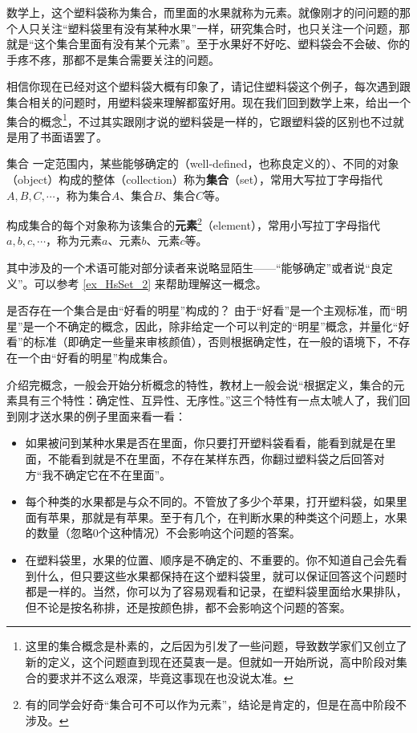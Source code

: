 数学上，这个塑料袋称为集合，而里面的水果就称为元素。就像刚才的问问题的那个人只关注“塑料袋里有没有某种水果”一样，研究集合时，也只关注一个问题，那就是“这个集合里面有没有某个元素”。至于水果好不好吃、塑料袋会不会破、你的手疼不疼，那都不是集合需要关注的问题。

相信你现在已经对这个塑料袋大概有印象了，请记住塑料袋这个例子，每次遇到跟集合相关的问题时，用塑料袋来理解都蛮好用。现在我们回到数学上来，给出一个集合的概念\footnote{这里的集合概念是朴素的，之后因为引发了一些问题，导致数学家们又创立了新的定义，这个问题直到现在还莫衷一是。但就如一开始所说，高中阶段对集合的要求并不这么艰深，毕竟这事现在也没说太准。}，不过其实跟刚才说的塑料袋是一样的，它跟塑料袋的区别也不过就是用了书面语罢了。

\begin{definition}{集合}\label{def_HsSet_2}
一定范围内，某些能够确定的（well-defined，也称良定义的）、不同的对象（object）构成的整体（collection）称为\textbf{集合}（set），常用大写拉丁字母指代$A,B,C,\cdots$，称为集合$A$、集合$B$、集合$C$等。

构成集合的每个对象称为该集合的\textbf{元素}\footnote{有的同学会好奇“集合可不可以作为元素”，结论是肯定的，但是在高中阶段不涉及。}（element），常用小写拉丁字母指代$a,b,c,\cdots$，称为元素$a$、元素$b$、元素$c$等。
\end{definition}

其中涉及的一个术语可能对部分读者来说略显陌生——“能够确定”或者说“良定义”。可以参考 \autoref{ex_HsSet_2} 来帮助理解这一概念。

\begin{example}{是否存在一个集合是由“好看的明星”构成的？}\label{ex_HsSet_2}
由于“好看”是一个主观标准，而“明星”是一个不确定的概念，因此，除非给定一个可以判定的“明星”概念，并量化“好看”的标准（即确定一些量来审核颜值），否则根据确定性，在一般的语境下，不存在一个由“好看的明星”构成集合。
\end{example}

介绍完概念，一般会开始分析概念的特性，教材上一般会说“根据定义，集合的元素具有三个特性：确定性、互异性、无序性。”这三个特性有一点太唬人了，我们回到刚才送水果的例子里面来看一看：

\begin{itemize}
\item 如果被问到某种水果是否在里面，你只要打开塑料袋看看，能看到就是在里面，不能看到就是不在里面，不存在某样东西，你翻过塑料袋之后回答对方“我不确定它在不在里面”。
\item 每个种类的水果都是与众不同的。不管放了多少个苹果，打开塑料袋，如果里面有苹果，那就是有苹果。至于有几个，在判断水果的种类这个问题上，水果的数量（忽略0个这种情况）不会影响这个问题的答案。
\item 在塑料袋里，水果的位置、顺序是不确定的、不重要的。你不知道自己会先看到什么，但只要这些水果都保持在这个塑料袋里，就可以保证回答这个问题时都是一样的。当然，你可以为了容易观看和记录，在塑料袋里面给水果排队，但不论是按名称排，还是按颜色排，都不会影响这个问题的答案。
\end{itemize}


